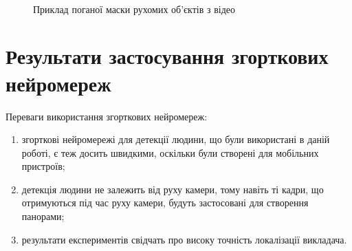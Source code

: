 \begin{figure}[H]
    \centering

     \\
    \caption{Приклад поганої маски рухомих об'єктів з відео \cite{video:dorohovtsev_spetskurs_vesna}
        \label{fig:bk_bad_mask}
    }
\end{figure}

\section{Результати застосування згорткових нейромереж}

Переваги використання згорткових нейромереж:
\begin{enumerate}
    \item згорткові нейромережі для детекції людини, що були використані в даній роботі,
          є теж досить швидкими, оскільки були створені для мобільних пристроїв;
    \item детекція людини не залежить від руху камери, тому навіть ті кадри, що
          отримуються під час руху камери, будуть застосовані для створення панорами;
    \item результати експериментів свідчать про високу точність локалізації викладача.
\end{enumerate}


